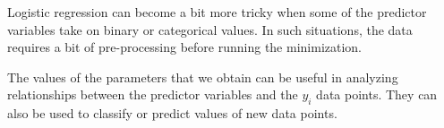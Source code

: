 Logistic regression can become a bit more tricky when some of the predictor variables take on binary or categorical values.
In such situations, the data requires a bit of pre-processing before running the minimization.

The values of the parameters that we obtain can be useful in analyzing relationships between the predictor variables and the $y_i$ data points.
They can also be used to classify or predict values of new data points.

